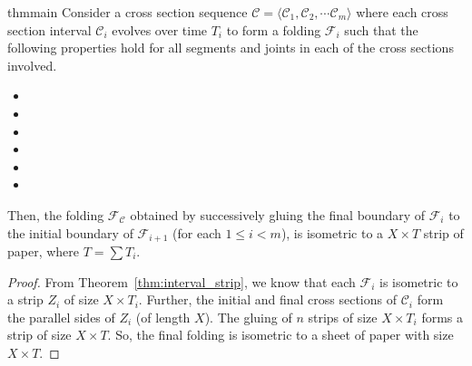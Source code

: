 \begin{restatable}{thm}{main}
\label{thm:main}
Consider a cross section sequence $\mathcal C = \langle \mathcal C_1, \mathcal C_2,\cdots \mathcal C_m \rangle$ where each
cross section interval $\mathcal C_i$ evolves over time $T_i$ to form a folding $\mathcal F_i$
such that the following properties hold for all segments and joints in each of the cross sections involved.
\begin{itemize}
    \item[] \vspace{-1.6em}\UniformVelocity*
    \item[] \vspace{-1.6em}\OrthogonalVelocity*
    \item[] \vspace{-1.6em}\JointOrthogonalVelocity*
    \item[] \vspace{-1.6em}\LeftRightPace*
    \item[] \vspace{-1.6em}\SegmentOrientation*
    \item[] \vspace{-1.6em}\JointVelocity*
\end{itemize}
Then, the folding $\mathcal F_{\mathcal C}$ obtained by successively gluing the final boundary of $\mathcal F_i$ to the initial boundary
of $\mathcal F_{i+1}$ (for each $1\le i<m$), is isometric to a $X\times T$ strip of paper, where $T = \sum T_i$.
\end{restatable}
\begin{proof}
From Theorem~\ref{thm:interval_strip}, we know that each $\mathcal F_i$ is isometric to a strip $Z_i$ of size $X\times T_i$.
Further, the initial and final cross sections of $\mathcal C_i$ form the parallel sides of $Z_i$ (of length $X$).
The gluing of $n$ strips of size $X\times T_i$ forms a strip of size $X\times T$.
So, the final folding is isometric to a sheet of paper with size $X\times T$.
\end{proof}
